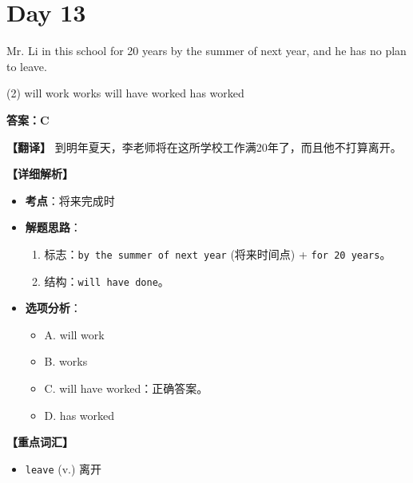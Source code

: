 \documentclass[11pt, a4paper]{article}
\newcommand{\analysis}[4]{
    \begin{solutionbox}
        \textbf{答案：#1}
        
        \textbf{【翻译】} #2
        
        \textbf{【详细解析】}
        #3
        
        \textbf{【重点词汇】}
        #4
    \end{solutionbox}
}
\newcommand{\blank}{\underline{\hspace{1.5cm}}}
\begin{document}
\section*{Day 13}
\begin{questions}
    \item Mr. Li \blank in this school for 20 years by the summer of next year, and he has no plan to leave.
    \begin{tasks}(2)
        \task will work \task works
        \task will have worked \task has worked
    \end{tasks}
    \analysis{C}{到明年夏天，李老师将在这所学校工作满20年了，而且他不打算离开。}{
        \begin{itemize}
            \item \textbf{考点}：将来完成时
            \item \textbf{解题思路}：
                \begin{enumerate}
                    \item 标志：\texttt{by the summer of next year} (将来时间点) + \texttt{for 20 years}。
                    \item 结构：\texttt{will have done}。
                \end{enumerate}
            \item \textbf{选项分析}：
                \begin{itemize}
                    \item A. will work
                    \item B. works
                    \item C. will have worked：正确答案。
                    \item D. has worked
                \end{itemize}
        \end{itemize}
    }{
        \begin{itemize}
            \item \texttt{leave} (v.) 离开
        \end{itemize}
    }


\end{questions}
\end{document}
